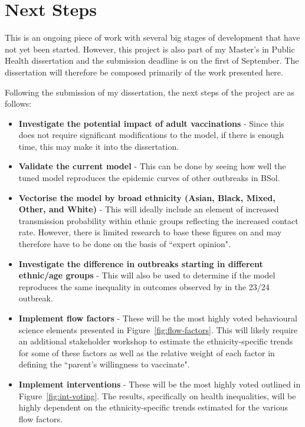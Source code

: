 \documentclass{article}
\begin{document}
\section{Next Steps}

This is an ongoing piece of work with several big stages of development that have not yet been started. However, this project is also part of my Master's in Public Health dissertation and the submission deadline is on the first of September. The dissertation will therefore be composed primarily of the work presented here. 

Following the submission of my dissertation, the next steps of the project are as follows:
\begin{itemize}
    \item \textbf{Investigate the potential impact of adult vaccinations} - Since this does not require significant modifications to the model, if there is enough time, this may make it into the dissertation. 
    \item \textbf{Validate the current model} - This can be done by seeing how well the tuned model reproduces the epidemic curves of other outbreaks in BSol.
    \item \textbf{Vectorise the model by broad ethnicity (Asian, Black, Mixed, Other, and White)} - This will ideally include an element of increased transmission probability within ethnic groups reflecting the increased contact rate. However, there is limited research to base these figures on and may therefore have to be done on the basis of ``expert opinion".
    \item \textbf{Investigate the difference in outbreaks starting in different ethnic/age groups} - This will also be used to determine if the model reproduces the same inequality in outcomes observed by \citeauthor{jary2025sociodemographic} in the 23/24 outbreak. 
    \item \textbf{Implement flow factors} - These will be the most highly voted behavioural science elements presented in Figure~\ref{fig:flow-factors}. This will likely require an additional stakeholder workshop to estimate the ethnicity-specific trends for some of these factors as well as the relative weight of each factor in defining the ``parent's willingness to vaccinate". 
    \item \textbf{Implement interventions} - These will be the most highly voted outlined in Figure~\ref{fig:int-voting}. The results, specifically on health inequalities, will be highly dependent on the ethnicity-specific trends estimated for the various flow factors.
\end{itemize}
\end{document}
